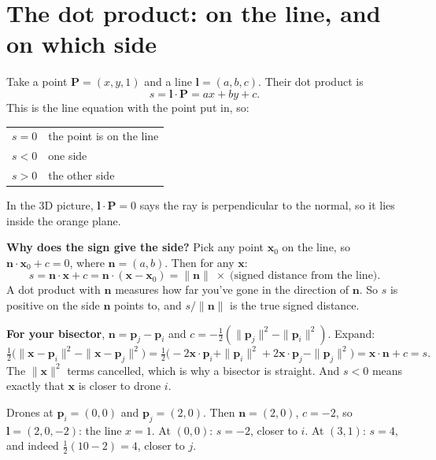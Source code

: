 \documentclass[11pt,a4paper]{article}
\newcommand{\vect}[1]{\mathbf{#1}}
\newcommand{\vP}{\vect{P}}
\newcommand{\vl}{\vect{l}}
\begin{document}
\section{The dot product: on the line, and on which side}\label{sec:dot}

Take a point $\vP=(x,y,1)$ and a line $\vl=(a,b,c)$. Their dot product is
\[
s=\vl\cdot\vP=ax+by+c .
\]
This is the line equation with the point put in, so:

\begin{center}
\begin{tabular}{ll}
\toprule
$s=0$ & the point is on the line\\
$s<0$ & one side\\
$s>0$ & the other side\\
\bottomrule
\end{tabular}
\end{center}

In the 3D picture, $\vl\cdot\vP=0$ says the ray is perpendicular to the normal, so it lies inside the orange plane.

\textbf{Why does the sign give the side?} Pick any point $\vect{x}_0$ on the line, so $\vect{n}\cdot\vect{x}_0+c=0$, where
$\vect{n}=(a,b)$. Then for any $\vect{x}$:
\[
s=\vect{n}\cdot\vect{x}+c=\vect{n}\cdot(\vect{x}-\vect{x}_0)=\|\vect{n}\|\;\times\;\text{(signed distance from the line)}.
\]
A dot product with $\vect{n}$ measures how far you've gone in the direction of $\vect{n}$. So $s$ is positive on the side
$\vect{n}$ points to, and $s/\|\vect{n}\|$ is the true signed distance.

\begin{whybox}
\textbf{For your bisector}, $\vect{n}=\vect{p}_j-\vect{p}_i$ and $c=-\tfrac12(\|\vect{p}_j\|^2-\|\vect{p}_i\|^2)$. Expand:
\[
\tfrac12\big(\|\vect{x}-\vect{p}_i\|^2-\|\vect{x}-\vect{p}_j\|^2\big)
=\tfrac12\big(-2\vect{x}\cdot\vect{p}_i+\|\vect{p}_i\|^2+2\vect{x}\cdot\vect{p}_j-\|\vect{p}_j\|^2\big)
=\vect{x}\cdot\vect{n}+c=s.
\]
The $\|\vect{x}\|^2$ terms cancelled, which is why a bisector is straight. And $s<0$ means exactly that $\vect{x}$ is closer
to drone $i$.
\end{whybox}

\begin{examplebox}
Drones at $\vect{p}_i=(0,0)$ and $\vect{p}_j=(2,0)$. Then $\vect{n}=(2,0)$, $c=-2$, so $\vl=(2,0,-2)$: the line $x=1$.
At $(0,0)$: $s=-2$, closer to $i$. At $(3,1)$: $s=4$, and indeed $\tfrac12(10-2)=4$, closer to $j$.
\end{examplebox}
\end{document}
